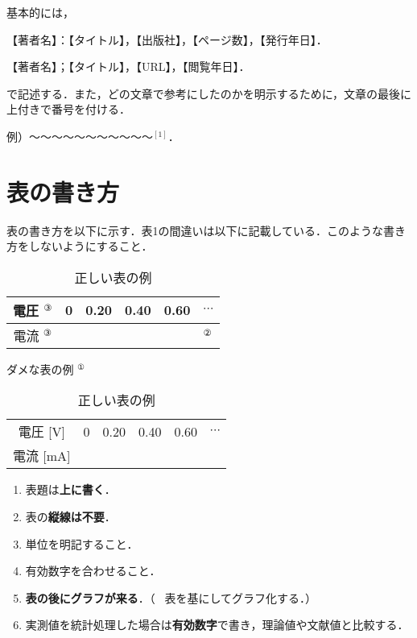 \documentclass[a4paper,11pt]{ltjsarticle}
\begin{document}
基本的には，

\begin{enumerate}[label={[}\arabic*{]}]
  \item 【著者名】：【タイトル】，【出版社】，【ページ数】，【発行年日】．
  \item 【著者名】；【タイトル】，【URL】，【閲覧年日】．
\end{enumerate}


で記述する．また，どの文章で参考にしたのかを明示するために，文章の最後に上付きで番号を付ける．

例）〜〜〜〜〜〜〜〜〜〜〜${}^{[1]}$．

\section{表の書き方}

表の書き方を以下に示す．表1の間違いは以下に記載している．このような書き方をしないようにすること．

\begin{table}[htbp]
  \begin{minipage}[b]{0.49\linewidth}
    \centering
    \begin{tabular}{|c|c|c|c|c|l|}
        \hline
        電圧 {\color{magenta}$^③$} & 0 & 0.20 & 0.40 & 0.60 & $\cdots$\\
        \hline
        電流 {\color{magenta}$^③$} &   &      &      &      & {\color{magenta}$^②$} \\
        \hline
    \end{tabular}
    \caption{ダメな表の例 {\color{magenta}$^①$}}
  \end{minipage}
  \begin{minipage}[b]{0.49\linewidth}
    \centering
    \caption{正しい表の例}
    \begin{tabular}{cccccc}
        \hline
        電圧 [V] & 0 & 0.20 & 0.40 & 0.60 & $\cdots$ \\
        電流 [mA] &  &      &      &      &      \\
        \hline
    \end{tabular}
  \end{minipage}
\end{table}

\begin{enumerate}[label={\color{magenta}\arabic*. }]
    \item 表題は\textbf{上に書く}．
    \item 表の\textbf{縦線は不要}．
    \item 単位を明記すること．
    \item 有効数字を合わせること．
    \item \textbf{表の後にグラフが来る}．（ \because\ 表を基にしてグラフ化する．）
    \item 実測値を統計処理した場合は\textbf{有効数字}で書き，理論値や文献値と比較する．
\end{enumerate}
\end{document}
